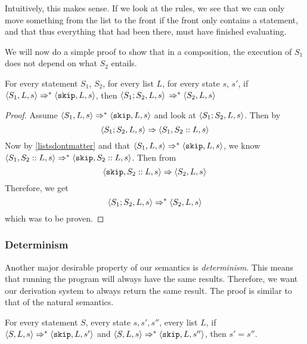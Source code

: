 Intuitively, this makes sense. If we look at the rules, we see that we can only move something from the list to the front if the front only contains a \sk statement, and that thus everything that had been there, must have finished evaluating. 

We will now do a simple proof to show that in a composition, the execution of $S_1$ does not depend on what $S_2$ entails. 

\begin{proposition}
For every statement $S_1$, $S_2$, for every list $L$, for every state $s$, $s'$, if $\langle S_1, L, s \rangle \Rightarrow ^{*} \langle \texttt{skip}, L, s \rangle$, then $\langle S_1;S_2, L, s \rangle$ $\Rightarrow ^{*} \langle S_2, L, s \rangle$
\end{proposition}

\begin{proof}
Assume $\langle S_1, L, s \rangle \Rightarrow ^{*} \langle \texttt{skip}, L, s \rangle$ and look at $\langle S_1;S_2, L, s \rangle$. Then by \compsos
$$\langle S_1;S_2, L, s \rangle \Rightarrow  \langle S_1, S_2::L, s \rangle$$
Now by \ref{listsdontmatter} and that $\langle S_1, L, s \rangle \Rightarrow ^{*} \langle \texttt{skip}, L, s \rangle$, we know $\langle S_1, S_2::L, s \rangle \Rightarrow ^{*} \langle \texttt{skip}, S_2::L, s \rangle$. Then from \loadsos
$$\langle \texttt{skip}, S_2::L, s \rangle \Rightarrow \langle S_2, L, s \rangle$$
Therefore, we get
$$\langle S_1;S_2, L, s \rangle \Rightarrow ^{*} \langle S_2, L, s \rangle$$
which was to be proven.
\end{proof}


\subsubsection*{Determinism}
Another major desirable property of our semantics is \emph{determinism}. This means that running the program will always have the same results. Therefore, we want our derivation system to always return the same result. The proof is similar to that of the natural semantics.

\begin{theorem}
For every statement $S$, every state $s, s', s''$, every list $L$, if $\langle S, L, s \rangle \Rightarrow ^{*} \langle \texttt{skip}, L, s' \rangle$ and $\langle S, L, s \rangle \Rightarrow ^{*} \langle \texttt{skip}, L, s'' \rangle$, then $s' = s''$.
\end{theorem}

